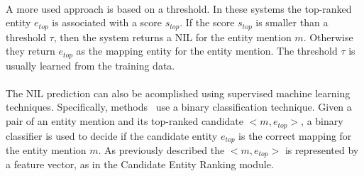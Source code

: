 \paragraph{}
A more used approach is based on a threshold. In these systems the top-ranked entity $e_{top}$ is associated with a score $s_{top}$. If the score $s_{top}$ is smaller than a threshold $\tau$, then the system returns a NIL for the entity mention $m$. Otherwise they return $e_{top}$ as the mapping entity for the entity mention. The threshold $\tau$ is usually learned from the training data.
\paragraph{}
The NIL prediction can also be acomplished using supervised machine learning techniques. Specifically, methods~\cite{ratinov2011local, zheng2010learning} use a binary classification technique. Given a pair of an entity mention and its top-ranked candidate $<\!\!m, e_{top}\!\!>$, a binary classifier is used to decide if the candidate entity $e_{top}$ is the correct mapping for the entity mention $m$. As previously described the $<\!\!m, e_{top}\!\!>$ is represented by a feature vector, as in the Candidate Entity Ranking module.
